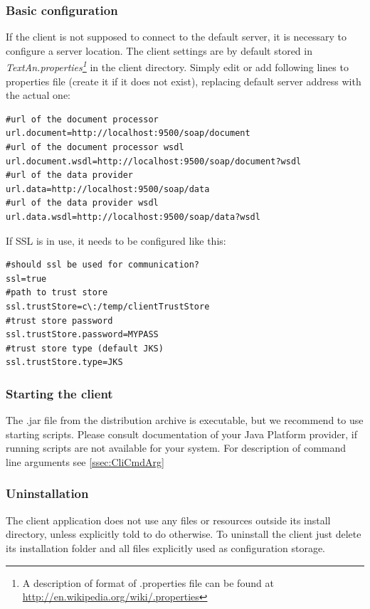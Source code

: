 \documentclass[12pt,a4paper]{report}
\begin{document}
\subsubsection{Basic configuration}

If the client is not supposed to connect to the default server, it is necessary to configure a server location. 
The client settings are by default stored in \emph{TextAn.properties\footnote{A description of format of .properties file can be found at \url{http://en.wikipedia.org/wiki/.properties}}}
in the client directory. 
Simply edit or add following lines to properties file (create it if it does not exist),
replacing default server address with the actual one:
\begin{lstlisting}[frame=single,language=properties]
#url of the document processor
url.document=http://localhost:9500/soap/document
#url of the document processor wsdl
url.document.wsdl=http://localhost:9500/soap/document?wsdl
#url of the data provider
url.data=http://localhost:9500/soap/data
#url of the data provider wsdl
url.data.wsdl=http://localhost:9500/soap/data?wsdl
\end{lstlisting}

If SSL is in use, it needs to be configured like this:
\begin{lstlisting}[frame=single,language=properties]
#should ssl be used for communication?
ssl=true
#path to trust store
ssl.trustStore=c\:/temp/clientTrustStore
#trust store password
ssl.trustStore.password=MYPASS
#trust store type (default JKS)
ssl.trustStore.type=JKS
\end{lstlisting}

\subsubsection{Starting the client}

The .jar file from the distribution archive is executable,
but we recommend to use starting scripts.
Please consult documentation of your Java Platform provider,
if running scripts are not available for your system.
For description of command line arguments see \ref{ssec:CliCmdArg}

\subsubsection{Uninstallation}

The client application does not use any files or resources outside its install directory,
unless explicitly told to do otherwise.
To uninstall the client just delete its installation folder
and all files explicitly used as configuration storage.
\end{document}
